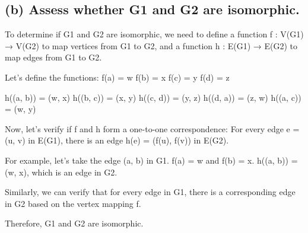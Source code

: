 \documentclass{article}
\begin{document}
\subsection*{(b) Assess whether G1 and G2 are isomorphic.}
To determine if G1 and G2 are isomorphic, we need to define a function f : V(G1) → V(G2) to map vertices from G1 to G2, and a function h : E(G1) → E(G2) to map edges from G1 to G2.

Let's define the functions:
f(a) = w
f(b) = x
f(c) = y
f(d) = z

h((a, b)) = (w, x)
h((b, c)) = (x, y)
h((c, d)) = (y, z)
h((d, a)) = (z, w)
h((a, c)) = (w, y)

Now, let's verify if f and h form a one-to-one correspondence:
For every edge e = (u, v) in E(G1), there is an edge h(e) = (f(u), f(v)) in E(G2).

For example, let's take the edge (a, b) in G1. f(a) = w and f(b) = x. h((a, b)) = (w, x), which is an edge in G2.

Similarly, we can verify that for every edge in G1, there is a corresponding edge in G2 based on the vertex mapping f.

Therefore, G1 and G2 are isomorphic.
\end{document}
